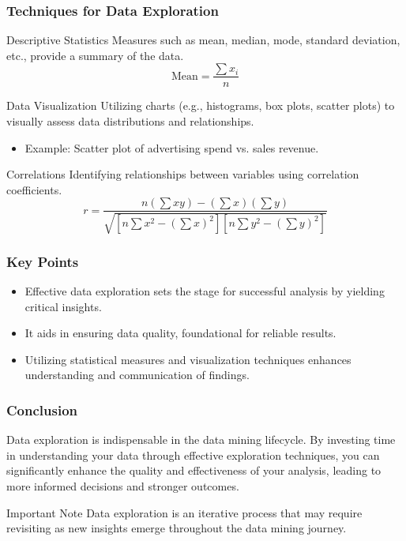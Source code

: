 \documentclass[aspectratio=169]{beamer}
\begin{document}
\begin{frame}[fragile]
    \frametitle{Techniques for Data Exploration}
    \begin{block}{Descriptive Statistics}
        Measures such as mean, median, mode, standard deviation, etc., provide a summary of the data. 
        \begin{equation}
            \text{Mean} = \frac{\sum x_i}{n}
        \end{equation}
    \end{block}

    \begin{block}{Data Visualization}
        Utilizing charts (e.g., histograms, box plots, scatter plots) to visually assess data distributions and relationships.
        \begin{itemize}
            \item Example: Scatter plot of advertising spend vs. sales revenue.
        \end{itemize}
    \end{block}

    \begin{block}{Correlations}
        Identifying relationships between variables using correlation coefficients.
        \begin{equation}
            r = \frac{n(\sum xy) - (\sum x)(\sum y)}{\sqrt{[n\sum x^2 - (\sum x)^2][n\sum y^2 - (\sum y)^2]}}
        \end{equation}
    \end{block}
\end{frame}

\begin{frame}[fragile]
    \frametitle{Key Points}
    \begin{itemize}
        \item Effective data exploration sets the stage for successful analysis by yielding critical insights.
        \item It aids in ensuring data quality, foundational for reliable results.
        \item Utilizing statistical measures and visualization techniques enhances understanding and communication of findings.
    \end{itemize}
\end{frame}

\begin{frame}[fragile]
    \frametitle{Conclusion}
    Data exploration is indispensable in the data mining lifecycle. By investing time in understanding your data through effective exploration techniques, you can significantly enhance the quality and effectiveness of your analysis, leading to more informed decisions and stronger outcomes. 
    \begin{block}{Important Note}
        Data exploration is an iterative process that may require revisiting as new insights emerge throughout the data mining journey.
    \end{block}
\end{frame}
\end{document}
